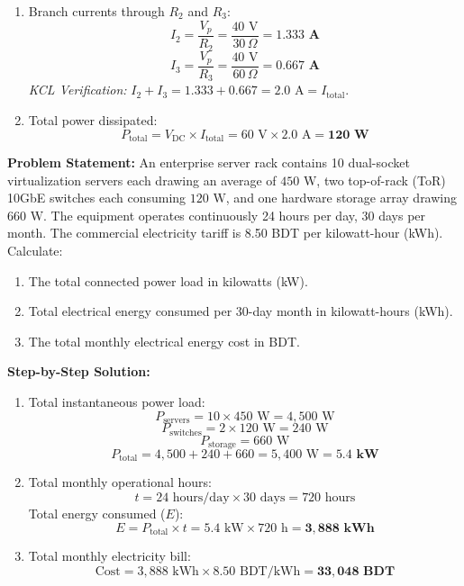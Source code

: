 \begin{tcolorbox}[colback=white,colframe=navyblue,title=\textbf{Problem 1: DC Series-Parallel Circuit Analysis and Power Dissipation}]
\begin{enumerate}[label=(\alph*),leftmargin=*]
\[    \]
    \item Branch currents through $R_2$ and $R_3$:
    \[
    I_2 = \frac{V_p}{R_2} = \frac{40\text{ V}}{30\,\Omega} = \mathbf{1.333\text{ A}}
    \]
    \[
    I_3 = \frac{V_p}{R_3} = \frac{40\text{ V}}{60\,\Omega} = \mathbf{0.667\text{ A}}
    \]
    \textit{KCL Verification:} $I_2 + I_3 = 1.333 + 0.667 = 2.0\text{ A} = I_{\text{total}}$.
    \item Total power dissipated:
    \[
    P_{\text{total}} = V_{\text{DC}} \times I_{\text{total}} = 60\text{ V} \times 2.0\text{ A} = \mathbf{120\text{ W}}
    \]
\end{enumerate}
\end{tcolorbox}

\begin{tcolorbox}[colback=white,colframe=navyblue,title=\textbf{Problem 2: Data Center Server Rack Energy Consumption and Billing}]
\textbf{Problem Statement:} An enterprise server rack contains 10 dual-socket virtualization servers each drawing an average of $450\text{ W}$, two top-of-rack (ToR) 10GbE switches each consuming $120\text{ W}$, and one hardware storage array drawing $660\text{ W}$. The equipment operates continuously 24 hours per day, 30 days per month. The commercial electricity tariff is 8.50 BDT per kilowatt-hour (kWh). Calculate:
\begin{enumerate}[label=(\alph*),leftmargin=*]
    \item The total connected power load in kilowatts (kW).
    \item Total electrical energy consumed per 30-day month in kilowatt-hours (kWh).
    \item The total monthly electrical energy cost in BDT.
\end{enumerate}
\textbf{Step-by-Step Solution:}
\begin{enumerate}[label=(\alph*),leftmargin=*]
    \item Total instantaneous power load:
    \[
    P_{\text{servers}} = 10 \times 450\text{ W} = 4,500\text{ W}
    \]
    \[
    P_{\text{switches}} = 2 \times 120\text{ W} = 240\text{ W}
    \]
    \[
    P_{\text{storage}} = 660\text{ W}
    \]
    \[
    P_{\text{total}} = 4,500 + 240 + 660 = 5,400\text{ W} = \mathbf{5.4\text{ kW}}
    \]
    \item Total monthly operational hours:
    \[
    t = 24\text{ hours/day} \times 30\text{ days} = 720\text{ hours}
    \]
    Total energy consumed ($E$):
    \[
    E = P_{\text{total}} \times t = 5.4\text{ kW} \times 720\text{ h} = \mathbf{3,888\text{ kWh}}
    \]
    \item Total monthly electricity bill:
    \[
    \text{Cost} = 3,888\text{ kWh} \times 8.50\text{ BDT/kWh} = \mathbf{33,048\text{ BDT}}
    \]
\end{enumerate}
\end{tcolorbox}


